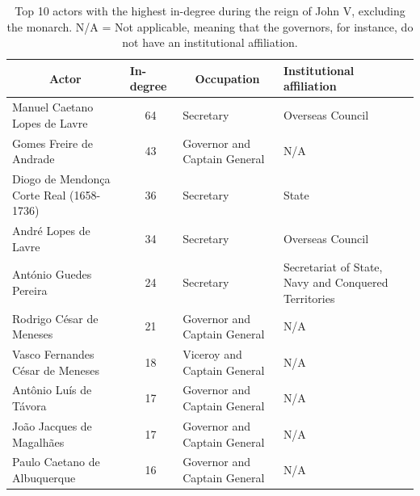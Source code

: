 \documentclass{article}
\begin{document}
\begin{table}[]
	\vspace{0.2cm}
	\centering
	\caption{Top 10 actors with the highest in-degree during the reign of John V, excluding the monarch. N/A = Not applicable, meaning that the governors, for instance, do not have an institutional affiliation.  \label{tb:in_john}}
	\vspace{0.2cm}
	\begin{tabular}{|p{4cm}|c|p{4cm}|p{4cm}|}
		\hline
		\multicolumn{1}{|c|}{Actor}              & \multicolumn{1}{l|}{In-degree} & \multicolumn{1}{c|}{Occupation}                   & \multicolumn{1}{l|}{Institutional affiliation}       \\ \hline
		Manuel Caetano Lopes de Lavre            & 64                             & Secretary                                         & Overseas Council                                     \\ \hline
		Gomes Freire de Andrade                  & 43                             & Governor and Captain General                      & N/A                                                  \\ \hline
		Diogo de Mendonça Corte Real (1658-1736) & 36                             & Secretary                                         & State                                                \\ \hline
		André Lopes de Lavre                     & 34                             & Secretary                                         & Overseas Council                                     \\ \hline
		António Guedes Pereira                   & 24                             & Secretary                                         & Secretariat of State, Navy and Conquered Territories \\ \hline
		Rodrigo César de Meneses                 & 21                             & Governor and Captain General                      & N/A                                                  \\ \hline
		Vasco Fernandes César de Meneses         & 18                             & Viceroy and Captain General                       & N/A                                                  \\ \hline
		Antônio Luís de Távora                   & 17                             & \multicolumn{1}{l|}{Governor and Captain General} & N/A                                                  \\ \hline
		João Jacques de Magalhães                & 17                             & \multicolumn{1}{l|}{Governor and Captain General} & N/A                                                  \\ \hline
		Paulo Caetano de Albuquerque             & 16                             & \multicolumn{1}{l|}{Governor and Captain General} & N/A                                                  \\ \hline
	\end{tabular}
\end{table}
\end{document}
